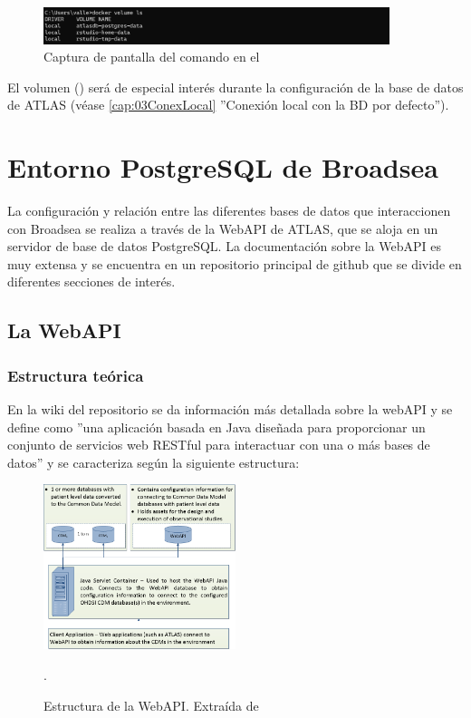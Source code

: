 \begin{figure}[H]
    \centering
    \includegraphics[width=0.90\textwidth]{figures/dockerVolumesCDM.png}
     \caption{Captura de pantalla del comando  en el }
    \label{fig:dockerVolumesCDM}
\end{figure}

El volumen  () será de especial interés durante la configuración de la base de datos de ATLAS (véase \ref{cap:03ConexLocal} ''Conexión local con la BD por defecto'').

\section{Entorno PostgreSQL de Broadsea}\label{sec:01Postgre}

La configuración y relación entre las diferentes bases de datos que interaccionen con Broadsea se realiza a través de la WebAPI de ATLAS, que se aloja en un servidor de base de datos PostgreSQL. La documentación sobre la WebAPI es muy extensa y se encuentra en un repositorio principal de github \cite{githubWebAPI} que se divide en diferentes secciones de interés.

\subsection{La WebAPI} \label{subsec:01webapi}

\subsubsection{Estructura teórica}

En la wiki del repositorio \cite{githubWebAPIwiki} se da información más detallada sobre la webAPI y se define como ''una aplicación basada en Java diseñada para proporcionar un conjunto de servicios web RESTful para interactuar con una o más bases de datos'' y se caracteriza según la siguiente estructura:

\begin{figure}[H]
    \centering
    \includegraphics[width=0.50\textwidth]{figures/webAPIwiki.png}
     \caption{Estructura de la WebAPI. Extraída de \cite{githubWebAPIwiki}}.
    \label{fig:webAPIwiki}
\end{figure}

